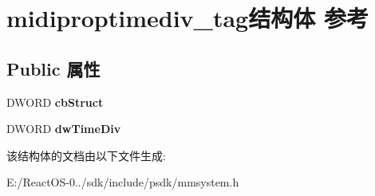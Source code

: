 \hypertarget{structmidiproptimediv__tag}{}\section{midiproptimediv\+\_\+tag结构体 参考}
\label{structmidiproptimediv__tag}
\subsection*{Public 属性}
\begin{DoxyCompactItemize}
\item 
\mbox{\label{structmidiproptimediv__tag_a0aa269413f5251a466d4e3f64705c5cb}} 
D\+W\+O\+RD {\bfseries cb\+Struct}
\item 
\mbox{\label{structmidiproptimediv__tag_a2f27174b43f54394a702d627bdaa0a2e}} 
D\+W\+O\+RD {\bfseries dw\+Time\+Div}
\end{DoxyCompactItemize}


该结构体的文档由以下文件生成\+:\begin{DoxyCompactItemize}
\item 
E\+:/\+React\+O\+S-\/0../sdk/include/psdk/mmsystem.\+h\end{DoxyCompactItemize}
